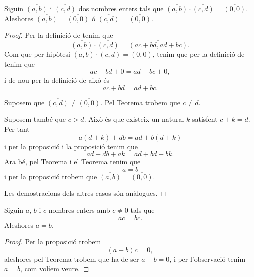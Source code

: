 \documentclass[../../Main.tex]{subfiles}
\begin{document}
	\begin{theorem}
		\label{thm:Z és un DI}
		Siguin \(\overline{(a,b)}\) i \(\overline{(c,d)}\) dos nombres enters tals que \(\overline{(a,b)}\cdot\overline{(c,d)}=\overline{(0,0)}\). Aleshores \(\overline{(a,b)}=\overline{(0,0)}\) ó \(\overline{(c,d)}=\overline{(0,0)}\).
		\begin{proof}
			Per la definició de  tenim que
			\[\overline{(a,b)}\cdot\overline{(c,d)}=\overline{(ac+bd,ad+bc)}.\]
			Com que per hipòtesi \(\overline{(a,b)}\cdot\overline{(c,d)}=\overline{(0,0)}\), tenim que per la definició de  tenim que
			\[ac+bd+0=ad+bc+0,\]
			i de nou per la definició de  això és
			\[ac+bd=ad+bc.\]
			
			Suposem que \(\overline{(c,d)}\neq\overline{(0,0)}\). Pel Teorema  trobem que \(c\neq d\).
			
			Suposem també que \(c>d\). Això és que existeix un natural \(k\) satisfent \(c+k=d\). Per tant %
			\[a(d+k)+db=ad+b(d+k)\]
			i per la proposició  i la proposició  tenim que
			\[ad+db+ak=ad+bd+bk.\]
			Ara bé, pel Teorema  i el Teorema  tenim que
			\[a=b\]
			i per la proposició  trobem que \(\overline{(a,b)}=\overline{(0,0)}\).
			
			Les demostracions dels altres casos són anàlogues.
		\end{proof}
	\end{theorem}
	\begin{corollary}
		\label{corollary:podem tatxar pels costats en Z pel producte}
		Siguin \(a\), \(b\) i \(c\) nombres enters amb \(c\neq0\) tals que
		\[ac=bc.\]
		Aleshores \(a=b\).
		\begin{proof}
			Per la proposició  trobem
			\[(a-b)c=0,\]
			aleshores pel Teorema  trobem que ha de ser \(a-b=0\), i per l'observació  tenim \(a=b\), com volíem veure.
		\end{proof}
	\end{corollary}
\end{document}
